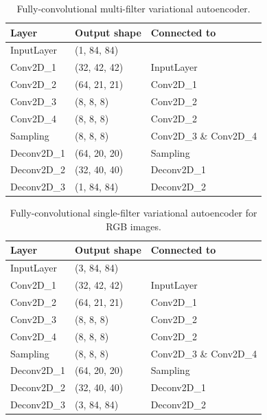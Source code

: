 \begin{table}[]
\centering
\label{my-label}
\begin{tabular}{@{}lll@{}}
\toprule
\textbf{Layer} & \textbf{Output shape} & \textbf{Connected to}  \\ \midrule
InputLayer     & (1, 84, 84)           &                        \\
Conv2D\_1      & (32, 42, 42)          & InputLayer             \\
Conv2D\_2      & (64, 21, 21)          & Conv2D\_1              \\
Conv2D\_3      & (8, 8, 8)             & Conv2D\_2              \\
Conv2D\_4      & (8, 8, 8)             & Conv2D\_2              \\
Sampling       & (8, 8, 8)             & Conv2D\_3 \& Conv2D\_4 \\
Deconv2D\_1    & (64, 20, 20)          & Sampling               \\
Deconv2D\_2    & (32, 40, 40)          & Deconv2D\_1            \\
Deconv2D\_3    & (1, 84, 84)           & Deconv2D\_2           
\end{tabular}
\caption{Fully-convolutional multi-filter variational autoencoder.}
\end{table}


\begin{table}[]
\centering
\label{my-label}
\begin{tabular}{@{}lll@{}}
\toprule
\textbf{Layer} & \textbf{Output shape} & \textbf{Connected to}  \\ \midrule
InputLayer     & (3, 84, 84)           &                        \\
Conv2D\_1      & (32, 42, 42)          & InputLayer             \\
Conv2D\_2      & (64, 21, 21)          & Conv2D\_1              \\
Conv2D\_3      & (8, 8, 8)             & Conv2D\_2              \\
Conv2D\_4      & (8, 8, 8)             & Conv2D\_2              \\
Sampling       & (8, 8, 8)             & Conv2D\_3 \& Conv2D\_4 \\
Deconv2D\_1    & (64, 20, 20)          & Sampling               \\
Deconv2D\_2    & (32, 40, 40)          & Deconv2D\_1            \\
Deconv2D\_3    & (3, 84, 84)           & Deconv2D\_2           
\end{tabular}
\caption{Fully-convolutional single-filter variational autoencoder for RGB images.}
\end{table}


